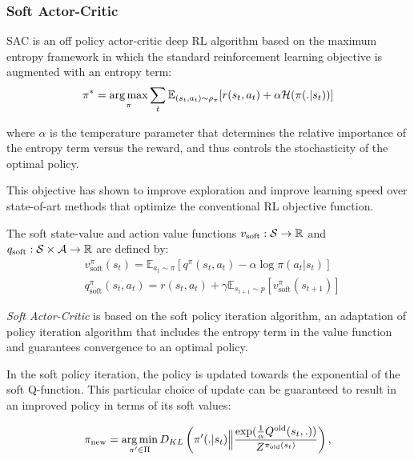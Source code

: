 \subsubsection{Soft Actor-Critic}
\label{sec:SAC}
SAC \cite{SAC, SAC_modified} is an off policy actor-critic deep RL algorithm based on the maximum entropy framework in which the standard reinforcement learning
objective is augmented with an entropy term:
\begin{equation*}
    \pi^* = \operatorname*{arg\,max}_\pi \sum_t \mathbb{E}_{(s_t, a_t) \sim \rho_\pi}[r(s_t, a_t) + \alpha \mathcal{H}(\pi(.|s_t))]
\end{equation*}

where $\alpha$ is the temperature parameter that determines the relative importance of the entropy term versus the reward, and thus controls the stochasticity
of the optimal policy.

This objective has shown to improve exploration and improve learning speed over state-of-art methods that optimize the conventional RL objective function.

\begin{definition}
    The soft state-value and action value functions  $v_{\text{soft}}: \mathcal{S} \to \mathbb{R}$ and $q_{\text{soft}}: \mathcal{S} \times \mathcal{A} \to \mathbb{R}$ are defined by:
    \begin{align*} 
        &v_\text{soft}^\pi(s_t) = \mathbb{E}_{a_t \sim \pi }[q^\pi(s_t, a_t) - \alpha \log \pi(a_t | s_t)] \\
        &q_\text{soft}^\pi(s_t, a_t) = r(s_t, a_t) + \gamma \mathbb{E}_{s_{t+1} \sim \mathit{p}}[v_\text{soft}^\pi(s_{t+1})]
    \end{align*}
\end{definition}

\textit{Soft Actor-Critic} is based on the soft policy iteration algorithm, an adaptation of policy iteration algorithm that includes the entropy term in the value function
and guarantees convergence to an optimal policy.

In the soft policy iteration, the policy is updated towards the exponential of the soft Q-function. This particular choice of update can be guaranteed
to result in an improved policy in terms of its soft values:

\begin{equation}
    \label{eq:soft_policy_improvement}
    \pi_\text{new} = \operatorname*{arg\,min}_{\pi' \in \Pi} D_{KL} \left(\pi'(.|s_t) \Big\Vert \frac{\exp(\frac{1}{\alpha}Q^\text{old}(s_t, .))}{Z^{\pi_{\text{old}}(s_t)}}\right),
\end{equation}

